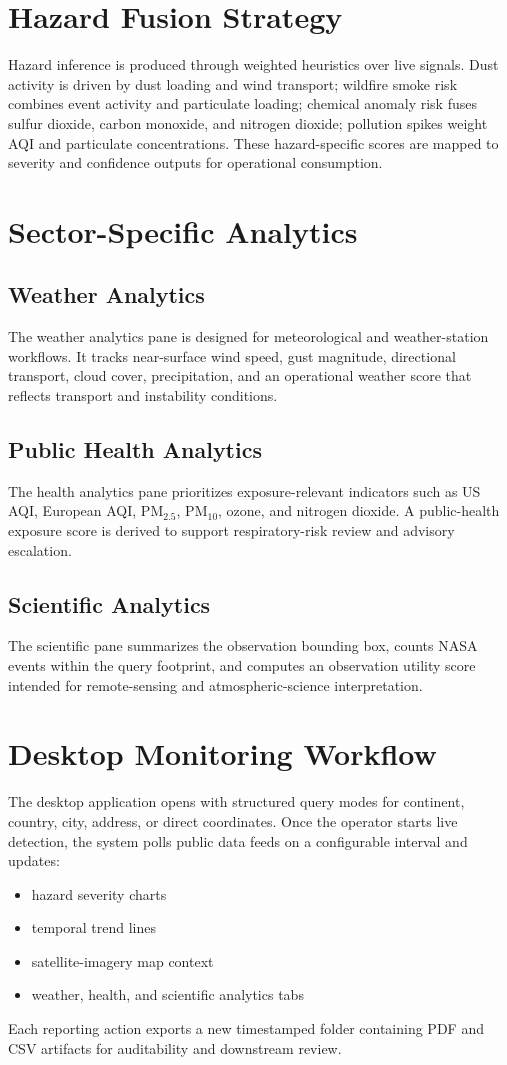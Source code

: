 \documentclass[conference]{IEEEtran}
\begin{document}
\section{Hazard Fusion Strategy}
Hazard inference is produced through weighted heuristics over live signals. Dust activity is driven by dust loading and wind transport; wildfire smoke risk combines event activity and particulate loading; chemical anomaly risk fuses sulfur dioxide, carbon monoxide, and nitrogen dioxide; pollution spikes weight AQI and particulate concentrations. These hazard-specific scores are mapped to severity and confidence outputs for operational consumption.

\section{Sector-Specific Analytics}
\subsection{Weather Analytics}
The weather analytics pane is designed for meteorological and weather-station workflows. It tracks near-surface wind speed, gust magnitude, directional transport, cloud cover, precipitation, and an operational weather score that reflects transport and instability conditions.

\subsection{Public Health Analytics}
The health analytics pane prioritizes exposure-relevant indicators such as US AQI, European AQI, PM$_{2.5}$, PM$_{10}$, ozone, and nitrogen dioxide. A public-health exposure score is derived to support respiratory-risk review and advisory escalation.

\subsection{Scientific Analytics}
The scientific pane summarizes the observation bounding box, counts NASA events within the query footprint, and computes an observation utility score intended for remote-sensing and atmospheric-science interpretation.

\section{Desktop Monitoring Workflow}
The desktop application opens with structured query modes for continent, country, city, address, or direct coordinates. Once the operator starts live detection, the system polls public data feeds on a configurable interval and updates:
\begin{itemize}
    \item hazard severity charts
    \item temporal trend lines
    \item satellite-imagery map context
    \item weather, health, and scientific analytics tabs
\end{itemize}
Each reporting action exports a new timestamped folder containing PDF and CSV artifacts for auditability and downstream review.
\end{document}
